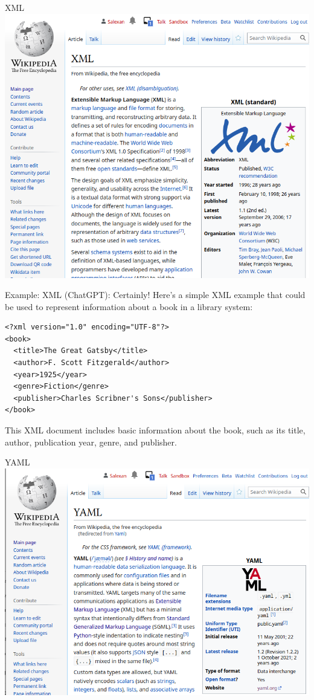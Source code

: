 \documentclass[aspectratio=169,graphics,handout]{beamer}
\begin{document}
\begin{frame}{XML}
    \includegraphics[width=\textwidth]{xml.png}
\end{frame}


\begin{frame}[fragile]{Example: XML}
    (ChatGPT): Certainly! Here's a simple XML example that could be used to represent information about a book in a library system:

    \begin{verbatim}
<?xml version="1.0" encoding="UTF-8"?>
<book>
  <title>The Great Gatsby</title>
  <author>F. Scott Fitzgerald</author>
  <year>1925</year>
  <genre>Fiction</genre>
  <publisher>Charles Scribner's Sons</publisher>
</book>
    \end{verbatim}

    This XML document includes basic information about the book, such as its title, author, publication year, genre, and publisher.
\end{frame}

\begin{frame}{YAML}
    \includegraphics[width=\textwidth]{yaml.png}
\end{frame}
\end{document}
